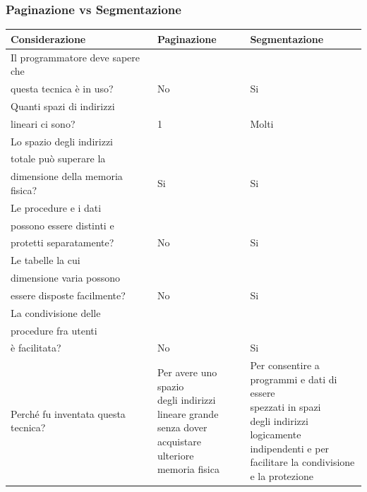 \documentclass{article}
\begin{document}
\subsubsection{Paginazione vs Segmentazione}
\begin{center}
    
    \begin{tabular}{lll}
        \toprule
        \textbf{Considerazione} & \textbf{Paginazione} & \textbf{Segmentazione}\\
        \midrule
        Il programmatore deve sapere che\\ questa tecnica è in uso? & No & Si\\
        \addlinespace
        \midrule
        Quanti spazi di indirizzi \\lineari ci sono? & 1 & Molti\\
        \addlinespace
        \midrule
        
        Lo spazio degli indirizzi\\ totale può superare la \\dimensione della memoria fisica? & Si & Si \\
        \addlinespace
        \midrule
        
        Le procedure e i dati\\ possono essere distinti e \\protetti separatamente? & No & Si \\
        \addlinespace
        \midrule
        
        Le tabelle la cui \\dimensione varia possono \\essere disposte facilmente? & No & Si \\
        \addlinespace
        \midrule
        
        La condivisione delle \\procedure fra utenti \\è facilitata? & No & Si\\
        \addlinespace
        \midrule
        
        Perché fu inventata questa tecnica? &  
        \makecell[l]{Per avere uno spazio\\
        degli indirizzi\\
        lineare grande\\
        senza dover\\
        acquistare\\
        ulteriore\\
        memoria fisica} & 
        \makecell[l]{Per consentire a \\programmi e dati di essere\\
        spezzati in spazi\\ degli indirizzi
        logicamente \\indipendenti
        e per \\facilitare la condivisione\\ e la protezione}\\
        \bottomrule
    \end{tabular}
\end{center}
    
\end{document}
